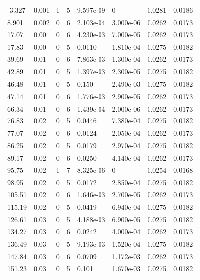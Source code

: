 \documentclass[preview]{standalone}
\begin{document}
{{\begin{tabular}{L{1.2cm}C{1.2cm} C{0.3cm}C{0.5cm} C{1.4cm}C{1.4cm} C{1.4cm}C{1.4cm}}
  -3.327  &  0.001  & 1     &  5 &  9.597e-09  & 0  & 0.0281 &  0.0186   \\ 
  8.901  &  0.002  & 0     &  6 &  2.103e-04  & 3.000e-06  & 0.0262 &  0.0173   \\ 
  17.07  &  0.00  & 0     &  6 &  4.230e-03  & 7.000e-05  & 0.0262 &  0.0173   \\ 
  17.83  &  0.00  & 0     &  5 &  0.0110  & 1.810e-04  & 0.0275 &  0.0182   \\ 
  39.69  &  0.01  & 0     &  6 &  7.863e-03  & 1.300e-04  & 0.0262 &  0.0173   \\ 
  42.89  &  0.01  & 0     &  5 &  1.397e-03  & 2.300e-05  & 0.0275 &  0.0182   \\ 
  46.48  &  0.01  & 0     &  5 &  0.150  & 2.490e-03  & 0.0275 &  0.0182   \\ 
  47.14  &  0.01  & 0     &  6 &  1.776e-03  & 2.900e-05  & 0.0262 &  0.0173   \\ 
  66.34  &  0.01  & 0     &  6 &  1.439e-04  & 2.000e-06  & 0.0262 &  0.0173   \\ 
  76.83  &  0.02  & 0     &  5 &  0.0446  & 7.380e-04  & 0.0275 &  0.0182   \\ 
  77.07  &  0.02  & 0     &  6 &  0.0124  & 2.050e-04  & 0.0262 &  0.0173   \\ 
  86.25  &  0.02  & 0     &  5 &  0.0179  & 2.970e-04  & 0.0275 &  0.0182   \\ 
  89.17  &  0.02  & 0     &  6 &  0.0250  & 4.140e-04  & 0.0262 &  0.0173   \\ 
  95.75  &  0.02  & 1     &  7 &  8.325e-06  & 0  & 0.0254 &  0.0168   \\ 
  98.95  &  0.02  & 0     &  5 &  0.0172  & 2.850e-04  & 0.0275 &  0.0182   \\ 
  105.51  &  0.02  & 0     &  6 &  1.646e-03  & 2.700e-05  & 0.0262 &  0.0173   \\ 
  115.19  &  0.02  & 0     &  5 &  0.0419  & 6.940e-04  & 0.0275 &  0.0182   \\ 
  126.61  &  0.03  & 0     &  5 &  4.188e-03  & 6.900e-05  & 0.0275 &  0.0182   \\ 
  134.27  &  0.03  & 0     &  6 &  0.0242  & 4.000e-04  & 0.0262 &  0.0173   \\ 
  136.49  &  0.03  & 0     &  5 &  9.193e-03  & 1.520e-04  & 0.0275 &  0.0182   \\ 
  147.84  &  0.03  & 0     &  6 &  0.0709  & 1.172e-03  & 0.0262 &  0.0173   \\ 
  151.23  &  0.03  & 0     &  5 &  0.101  & 1.670e-03  & 0.0275 &  0.0182   \\ 

\end{tabular}}}
\end{document}

